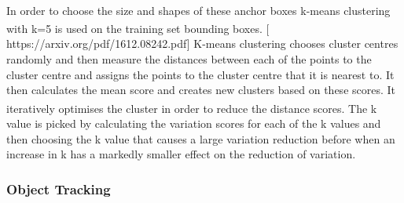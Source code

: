 \documentclass[11pt]{article}		%
\newcommand{\supercite}[1]{\textsuperscript{\cite{#1}}}		%
\begin{document}
	        \\
	        In order to choose the size and shapes of these anchor boxes k-means clustering with k=5 is used on the training set bounding boxes.\supercite{YOLOV2} [  https://arxiv.org/pdf/1612.08242.pdf]  K-means clustering chooses cluster centres randomly and then measure the distances between each of the points to the cluster centre and assigns the points to the cluster centre that it is nearest to. It then calculates the mean score and creates new clusters based on these scores. It iteratively optimises the cluster in order to reduce the distance scores.\supercite{k-means-clustering} The k value is picked by calculating the variation scores for each of the k values and then choosing the k value that causes a large variation reduction before when an increase in k has a markedly smaller effect on the reduction of variation. 
	
	        
	        \subsubsection{Object Tracking}
	        
\end{document}
